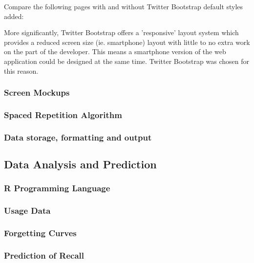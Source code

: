 Compare the following pages with and without Twitter Bootstrap default styles added:

More significantly, Twitter Bootstrap offers a 'responsive' layout system which provides a reduced screen size (ie. smartphone) layout with little to no extra work on the part of the developer. This means a smartphone version of the web application could be designed at the same time. Twitter Bootstrap was chosen for this reason.
\subsubsection{Screen Mockups}
\subsubsection{Spaced Repetition Algorithm}
\subsubsection{Data storage, formatting and output}

\subsection{Data Analysis and Prediction}
\subsubsection{R Programming Language}
\subsubsection{Usage Data}
\subsubsection{Forgetting Curves}
\subsubsection{Prediction of Recall}